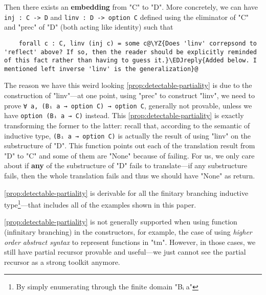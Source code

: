 \begin{theorem}
\begin{itemize}
\begin{itemize}
    \end{itemize}
  \end{itemize}
  Then there exists an \textbf{embedding} from "C" to "D".
  More concretely, we can have \texttt{inj : C -> D} and 
  \texttt{linv : D -> option C} defined using the eliminator of\/
  "C" and "prec" of\/ "D" (both acting like identity) such that
  \begin{verbatim}
    forall c : C, linv (inj c) = some c@\YZ{Does 'linv' correpsond to 'reflect' above? If so, then the reader should be explicitly reminded of this fact rather than having to guess it.}\EDJreply{Added below. I mentioned left inverse 'linv' is the generalization}@
  \end{verbatim}
\end{theorem}
The reason we have this weird looking \ref{prop:detectable-partiality}
is due to the construction of "linv"---at one point, using "prec" to
construct "linv", we need to prove \texttt{∀ a, (Bᵢ a → option
C) → option C}, generally not provable, unless we have
\texttt{option (Bᵢ a → C)} instead.
This \ref{prop:detectable-partiality} is exactly transforming the former to
the latter:
recall that, according to the semantic of inductive type,
\texttt{(Bᵢ a → option C)} is actually the result of using
"linv" on the substructure of "D". This function points out each of the
translation result from "D" to "C" and some of them are "None" because
of failing. For us, we only care about if \textbf{any} of the
substructure of "D" fails to translate---if any substructure fails,
then the whole translation fails and thus we should have "None" as
return.

\ref{prop:detectable-partiality} is derivable for all the finitary branching inductive type\footnote{By simply enumerating through the finite domain "Bᵢ a"}---that includes all of the examples shown in this paper. 

\ref{prop:detectable-partiality} is not generally supported when using function (infinitary branching) in the constructors, for example, the case of using \textit{higher order abstract syntax} to represent functions in "tm". However, in those cases, we still have partial recursor provable and useful---we just cannot see the partial recursor as a strong toolkit anymore.



